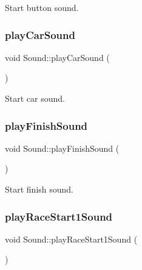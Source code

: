 Start button sound. 

\mbox{\label{class_sound_a990af8a6d794d159979c1e7b0a3bc2cd}} 
\subsubsection{\texorpdfstring{playCarSound}{playCarSound}}
{\footnotesize\ttfamily void Sound\+::play\+Car\+Sound (\begin{DoxyParamCaption}{ }\end{DoxyParamCaption})\hspace{0.3cm}{\ttfamily [slot]}}



Start car sound. 

\mbox{\label{class_sound_a9d8b76aaa9b830241ba00042d6c48e20}} 
\subsubsection{\texorpdfstring{playFinishSound}{playFinishSound}}
{\footnotesize\ttfamily void Sound\+::play\+Finish\+Sound (\begin{DoxyParamCaption}{ }\end{DoxyParamCaption})\hspace{0.3cm}{\ttfamily [slot]}}



Start finish sound. 

\mbox{\label{class_sound_af5b6e31181dfba9b236d79aacd862fee}} 
\subsubsection{\texorpdfstring{playRaceStart1Sound}{playRaceStart1Sound}}
{\footnotesize\ttfamily void Sound\+::play\+Race\+Start1\+Sound (\begin{DoxyParamCaption}{ }\end{DoxyParamCaption})\hspace{0.3cm}{\ttfamily [slot]}}



